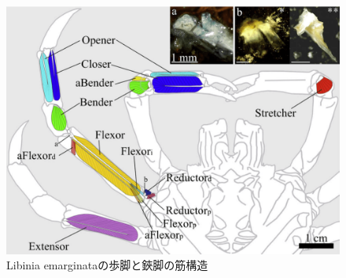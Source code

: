 \begin{figure}[t]
  \centering
  \vspace{-3mm}
  \includegraphics[scale=0.25]{image/libinia.png}
  \caption{Libinia emarginataの歩脚と鋏脚の筋構造\cite{VIDALGADEA2009179}}
  \label{fig:libinia}
\end{figure}
%
